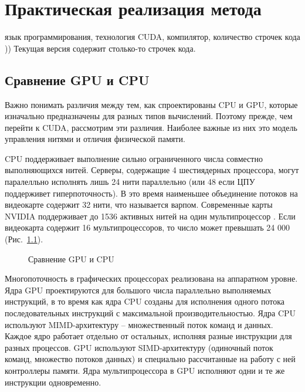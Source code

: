 \documentclass[a4paper,14pt,russian]{extreport}
\begin{document}
\chapter{Практическая реализация метода} 
 
язык программирования, технология CUDA, компилятор, количество строчек кода )) Текущая версия содержит столько-то строчек кода. 


\section{Сравнение GPU и CPU} 

Важно понимать различия между тем, как спроектированы CPU и GPU, которые изначально предназначены для разных типов вычислений. Поэтому прежде, чем перейти к CUDA, рассмотрим эти различия. Наиболее важные из них это модель управления нитями и отличия физической памяти.
\par CPU поддерживает выполнение сильно ограниченного числа совместно выполняющихся нитей. Серверы, содержащие 4 шестиядерных процессора, могут паралелльно исполнять лишь 24 нити параллельно (или 48 если ЦПУ поддерживет гиперпоточность). В это время наименьшее объединение потоков на видеокарте содержит 32 нити, что называется варпом. Современные карты NVIDIA поддерживает до 1536 активных нитей на один мультипроцессор \cite{features}. Если видеокарта содержит 16 мультипроцессоров, то число может превышать 24 000 (Рис.~\ref{ris:compare}).
\par
  \begin{figure}[h]
  \caption{Сравнение GPU и CPU}
  \label{ris:compare}
  \end{figure}
\par Многопоточность в графических процессорах реализована на аппаратном уровне. Ядра GPU проектируются для большого числа параллельно выполняемых инструкций, в то время как ядра CPU созданы для исполнения одного потока последовательных инструкций с максимальной производительностью. Ядра CPU используют MIMD-архитектуру – множественный поток команд и данных. Каждое ядро работает отдельно от остальных, исполняя разные инструкции для разных процессов. GPU используют SIMD-архитектуру (одиночный поток команд, множество потоков данных) и специально рассчитанные на работу с ней контроллеры памяти. Ядра мультипроцессора в GPU исполняют одни и те же инструкции одновременно. 
\end{document}
